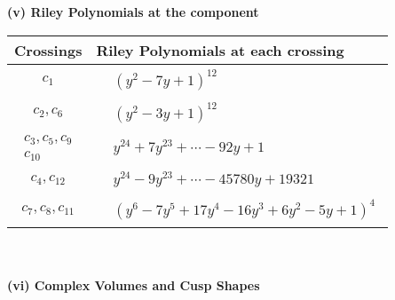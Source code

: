 \documentclass[1p]{elsarticle_modified}
\theoremstyle{definition}
\begin{document}
\newpage\renewcommand{\arraystretch}{1}
\flushleft \textbf{(v) Riley Polynomials at the component}\newline \\
\begin{tabular}{m{50pt}|m{274pt}}
Crossings & \hspace{64pt}Riley Polynomials at each crossing \\
\hline $$\begin{aligned}c_{1}\end{aligned}$$&$\begin{aligned}
&(y^2-7 y+1)^{12}
\end{aligned}$\\
\hline $$\begin{aligned}c_{2},c_{6}\end{aligned}$$&$\begin{aligned}
&(y^2-3 y+1)^{12}
\end{aligned}$\\
\hline $$\begin{aligned}c_{3},c_{5},c_{9}\\c_{10}\end{aligned}$$&$\begin{aligned}
&y^{24}+7 y^{23}+\cdots-92 y+1
\end{aligned}$\\
\hline $$\begin{aligned}c_{4},c_{12}\end{aligned}$$&$\begin{aligned}
&y^{24}-9 y^{23}+\cdots-45780 y+19321
\end{aligned}$\\
\hline $$\begin{aligned}c_{7},c_{8},c_{11}\end{aligned}$$&$\begin{aligned}
&(y^6-7 y^5+17 y^4-16 y^3+6 y^2-5 y+1)^4
\end{aligned}$\\
\hline
\end{tabular}\\~\\
\newpage\flushleft \textbf{(vi) Complex Volumes and Cusp Shapes}
\end{document}

